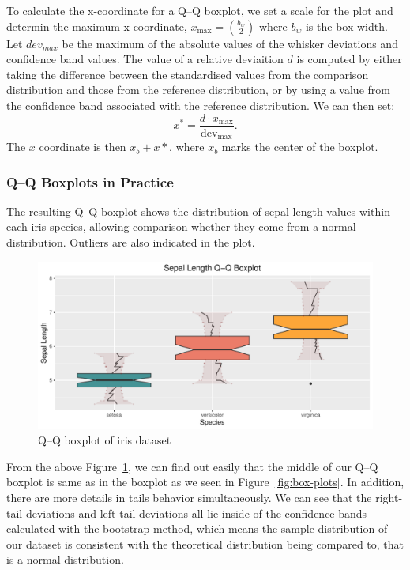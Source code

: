 \documentclass{article}\usepackage[]{graphicx}\usepackage[]{xcolor}
\makeatletter
\def\maxwidth{ %
  \ifdim\Gin@nat@width>\linewidth
    \linewidth
  \else
    \Gin@nat@width
  \fi
}
\newenvironment{knitrout}{}{} %
\numberwithin{equation}{section}
\makeatother
\begin{document}
\noindent
To calculate the x-coordinate for a Q–Q boxplot, we set a scale for the plot and determin the maximum x-coordinate, $x_{\text{max}}=(\frac{b_w}{2})$ where $b_w$ is the box width. Let $dev_{max}$ be the maximum of the absolute values of the whisker deviations and confidence band values. The value of a relative deviaition $d$ is computed by either taking the difference between the standardised values from the comparison distribution and those from the reference distribution, or by using a value from the confidence band associated with the reference distribution. We can then set:
$$x^* = \frac{d \cdot x_{\text{max}}}{\text{dev}_{\text{max}}}.$$
The $x$ coordinate is then $x_b+x*$, where $x_b$ marks the center of the boxplot.


\subsubsection{Q–Q Boxplots in Practice}
The resulting Q–Q boxplot shows the distribution of sepal length values within each iris species, allowing comparison whether they come from a normal distribution. Outliers are also indicated in the plot.\\

\begin{knitrout}\scriptsize
{}\color{fgcolor}\begin{figure}[h]

{\centering \includegraphics[width=\maxwidth]{figure/beamer-QQboxplots-1} 

}

\caption[Q–Q boxplot of iris dataset]{Q–Q boxplot of iris dataset}\label{fig:QQboxplots}
\end{figure}

\end{knitrout}

\noindent
From the above Figure~\ref{fig:QQboxplots}, we can find out easily that the middle of our Q–Q boxplot is same as in the boxplot as we seen in Figure~\ref{fig:box-plots}. In addition, there are more details in tails behavior simultaneously. We can see that the right-tail deviations and left-tail deviations all lie inside of the confidence bands calculated with the bootstrap method, which means the sample distribution of our dataset is consistent with the theoretical distribution being compared to, that is a normal distribution.
\noindent



\newpage  


\printindex
  

\newpage

\end{document}
